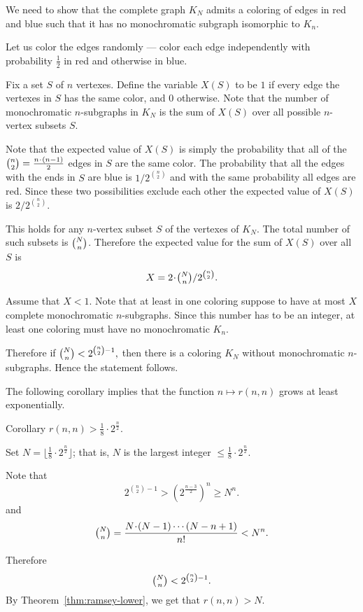 We need to show that the complete graph $K_N$
admits a coloring of edges in red and blue such that it has no monochromatic subgraph isomorphic to $K_n$.

Let us color the edges randomly ---
color each edge independently with probability $\tfrac12$ in red and otherwise in blue.

Fix a set $S$ of $n$ vertexes. 
Define the variable $X(S)$ to be $1$ if every edge the vertexes in $S$ has the same color, and $0$ otherwise.
Note that the number of monochromatic $n$-subgraphs in $K_N$ is the sum of $X(S)$ over all possible $n$-vertex subsets $S$. 

Note that the expected value of $X(S)$ is simply the probability that all of the $\tbinom n 2=\tfrac{n\cdot(n-1)}{2}$
edges in $S$ are the same color. 
The probability that all the edges with the ends in $S$ are blue is ${1}/{2^{\binom n 2}}$ and with the same probability all edges are red.
Since these two possibilities exclude each other the expected value of $X(S)$ is 
${2}/{2^{\binom n 2}}.$

This holds for any $n$-vertex subset $S$ of the vertexes of $K_N$.
The total number of such subsets is $\tbinom N n$.
Therefore the expected value for the sum of $X(S)$ over all $S$ is
\[X=2\cdot \tbinom N n/2^{\binom n 2}.\]

Assume that $X<1$.
Note that at least in one coloring suppose to have at most $X$ complete monochromatic $n$-subgraphs.
Since this number has to be an integer, at least one coloring must have no monochromatic $K_n$. 

Therefore if
$\tbinom N n < 2^{\binom n 2 - 1},$
then there is a coloring $K_N$ without monochromatic $n$-subgraphs.
Hence the statement follows.
\qeds

The following corollary implies that the function $n\mapsto r(n,n)$ grows at least exponentially. 

\begin{thm}{Corollary}\label{cor:2^n/2}
$r(n, n)> \tfrac1{8}\cdot 2^{\frac{n}{2}}$.
\end{thm}

Set $N=\lfloor\tfrac1{8}\cdot 2^{\frac{n}{2}}\rfloor$;
that is, $N$ is the largest integer $\le\tfrac1{8}\cdot 2^{\frac{n}{2}}$.

Note that 
\[2^{\binom n 2 - 1}> (2^{\frac{n-3}2})^n\ge N^n.\]
and
\[\tbinom N n=\frac{N\cdot(N-1)\cdots (N-n+1)}{n!}<  N^n.\]

Therefore  
\[\tbinom N n<2^{\binom n 2 - 1}.\]
By Theorem~\ref{thm:ramsey-lower}, we get that $r(n,n)> N$.
\qeds

